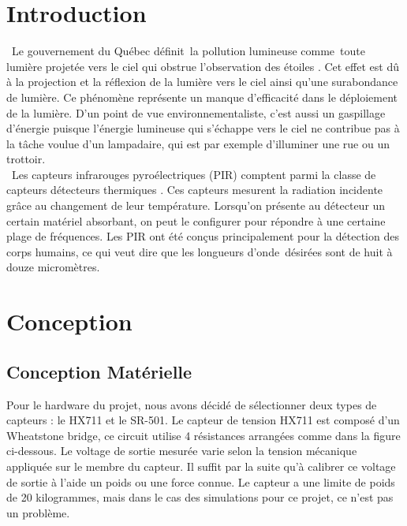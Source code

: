 \documentclass[journal]{IEEEtran}
\begin{document}
\section{Introduction}
 Le gouvernement du Québec définit la pollution lumineuse comme toute 
lumière projetée vers le ciel qui obstrue l'observation des étoiles \cite{b1}.
 Cet effet est dû à la projection et la réflexion de la lumière vers le ciel ainsi qu'une surabondance de lumière.
  Ce phénomène représente un manque d'efficacité dans le déploiement de la lumière. D'un point de vue environnementaliste, 
  c'est aussi un gaspillage d'énergie puisque l'énergie lumineuse qui s'échappe vers le ciel ne contribue pas à la tâche voulue d'un lampadaire, 
  qui est par exemple d'illuminer une rue ou un trottoir. \\
   Les capteurs infrarouges pyroélectriques (PIR) comptent parmi la classe de capteurs détecteurs thermiques \cite{b2}. 
  Ces capteurs mesurent la radiation incidente grâce au changement de leur température. Lorsqu'on présente au détecteur un certain matériel absorbant, on peut le configurer pour répondre à une certaine plage de fréquences. 
  Les PIR ont été conçus principalement pour la détection des corps humains, ce qui veut dire que les longueurs d'onde désirées sont de huit à douze micromètres. 

\section{Conception}

\subsection{Conception Matérielle}

Pour le hardware du projet, nous avons décidé de sélectionner deux types de capteurs : le HX711 et le SR-501. Le capteur de tension HX711 est composé d’un Wheatstone bridge, ce circuit utilise 4 résistances arrangées comme dans la figure ci-dessous.
Le voltage de sortie mesurée varie selon la tension mécanique appliquée sur le membre du capteur. Il suffit par la suite qu’à calibrer ce voltage de sortie à l’aide un poids ou une force connue. 
Le capteur a une limite de poids de 20 kilogrammes, mais dans le cas des simulations pour ce projet, ce n’est pas un problème. 
\end{document}
